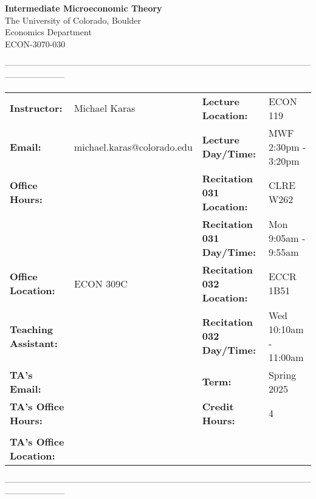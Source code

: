 \documentclass[11pt]{article}
\begin{document}
\begin{center}
\textbf{\Large Intermediate Microeconomic Theory}\\
The University of Colorado, Boulder\\ Economics Department\\ ECON-3070-030
\end{center}

---------------------------------------------------------------------------------------------------------------------------------
\vspace{-.1in}
\begin{center}
\begin{tabular}{llll}
    \textbf{Instructor:} & \footnotesize{Michael Karas}  &   \textbf{Lecture Location:}  & \footnotesize{ECON 119}\\ 
    \textbf{Email:} & \footnotesize{michael.karas@colorado.edu} &   \textbf{Lecture Day/Time:} & \footnotesize{MWF 2:30pm - 3:20pm}\\
    \textbf{Office Hours:} & \footnotesize{}   &  \textbf{Recitation 031 Location:} & \footnotesize{CLRE W262} \\
    \textbf{} & \footnotesize{}   &  \textbf{Recitation 031 Day/Time:} & \footnotesize{Mon 9:05am - 9:55am} \\
    \textbf{Office Location:} & \footnotesize{ECON 309C}  & \textbf{Recitation 032 Location:} & \footnotesize{ECCR 1B51}\\
    \textbf{Teaching Assistant:} & \footnotesize{}   & \textbf{Recitation 032 Day/Time:} & \footnotesize{Wed 10:10am - 11:00am}\\
    \textbf{TA's Email:} & \footnotesize{}   & \textbf{Term:} & \footnotesize{Spring 2025}\\
    \textbf{TA's Office Hours:} & \footnotesize{}   & \textbf{Credit Hours:} & \footnotesize{4}\\
    \textbf{} & \footnotesize{}   &  \textbf{} & \footnotesize{} \\
        \textbf{TA's Office Location:} & \footnotesize{}   & \textbf{} & \\
\end{tabular}
\end{center}

---------------------------------------------------------------------------------------------------------------------------------
\end{document}
